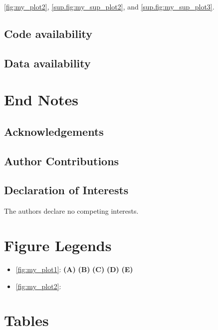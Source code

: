 \documentclass{article}
\begin{document}
\subsubsection*{\lipsum[10][3]}
\lipsum[13][1]
\cite{hinton2006reducing, chollet2015keras}
\lipsum[13][2-3]
\ref{fig:my_plot2}, \ref{sup.fig:my_sup_plot2}, and \ref{sup.fig:my_sup_plot3}.

\subsection*{Code availability}
\lipsum[5]

\subsection*{Data availability}
\lipsum[6]

\newpage



\newpage
\section*{End Notes}
\subsection*{Acknowledgements}
\lipsum[7]

\subsection*{Author Contributions}
\lipsum[8]

\subsection*{Declaration of Interests}
The authors declare no competing interests.

\newpage
\section*{Figure Legends}
\begin{itemize}
	\item[] \ref{fig:my_plot1}: \textbf{\lipsum[20][1]} \textbf{(A)} \lipsum[12][1] \textbf{(B)} \lipsum[12][2] \textbf{(C)} \lipsum[12][3] \textbf{(D)} \lipsum[12][4] \textbf{(E)} \lipsum[12][5]
	\item[] \ref{fig:my_plot2}: \textbf{\lipsum[20][2]} \lipsum[13][1-4]
\end{itemize}

\newpage
\section*{Tables}
\lipsum[9][1-2]
\end{document}
